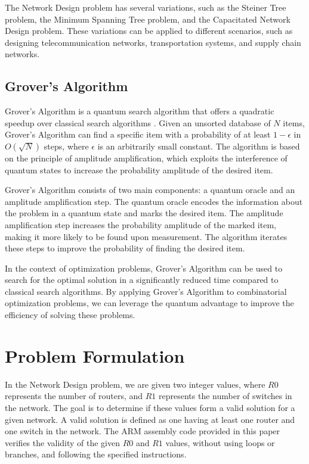 The Network Design problem has several variations, such as the Steiner Tree problem, the Minimum Spanning Tree problem, and the Capacitated Network Design problem. These variations can be applied to different scenarios, such as designing telecommunication networks, transportation systems, and supply chain networks.

\subsection{Grover's Algorithm}

Grover's Algorithm is a quantum search algorithm that offers a quadratic speedup over classical search algorithms \cite{grover1996fast}. Given an unsorted database of $N$ items, Grover's Algorithm can find a specific item with a probability of at least $1 - \epsilon$ in $O(\sqrt{N})$ steps, where $\epsilon$ is an arbitrarily small constant. The algorithm is based on the principle of amplitude amplification, which exploits the interference of quantum states to increase the probability amplitude of the desired item.

Grover's Algorithm consists of two main components: a quantum oracle and an amplitude amplification step. The quantum oracle encodes the information about the problem in a quantum state and marks the desired item. The amplitude amplification step increases the probability amplitude of the marked item, making it more likely to be found upon measurement. The algorithm iterates these steps to improve the probability of finding the desired item.

In the context of optimization problems, Grover's Algorithm can be used to search for the optimal solution in a significantly reduced time compared to classical search algorithms. By applying Grover's Algorithm to combinatorial optimization problems, we can leverage the quantum advantage to improve the efficiency of solving these problems.


\section{Problem Formulation}
In the Network Design problem, we are given two integer values, where $R0$ represents the number of routers, and $R1$ represents the number of switches in the network. The goal is to determine if these values form a valid solution for a given network. A valid solution is defined as one having at least one router and one switch in the network. The ARM assembly code provided in this paper verifies the validity of the given $R0$ and $R1$ values, without using loops or branches, and following the specified instructions.

